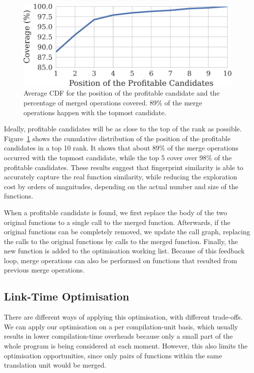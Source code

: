 \begin{figure}[t!]
  \centering
  \includegraphics[width=0.8\linewidth]{src/merging-optimisation/figs/average-cdf-exploration-threshold.pdf}
  \caption{Average CDF for the position of the profitable candidate and the percentage of merged operations covered.
           89\% of the merge operations happen with the topmost candidate.}
  \label{fig:average-cdf-exploration-threshold}
\end{figure}

Ideally, profitable candidates will be as close to the top of the rank as
possible.
Figure~\ref{fig:average-cdf-exploration-threshold} shows the cumulative
distribution of the position of the profitable candidates in a top 10 rank.
It shows that about 89\% of the merge operations occurred with the topmost
candidate, while the top 5 cover over 98\% of the profitable candidates.
These results suggest that fingerprint similarity is able to
accurately capture the real function similarity, while reducing the exploration
cost by orders of magnitudes, depending on the actual number and size of
the functions.

When a profitable candidate is found, we first replace the body of the two
original functions to a single call to the merged function.
Afterwards, if the original functions can be completely removed, we update the
call graph, replacing the calls to the original functions by calls to the
merged function.
Finally, the new function is added to the optimisation working list.
Because of this feedback loop, merge operations can also be performed on
functions that resulted from previous merge operations.

\subsection{Link-Time Optimisation}

There are different ways of applying this optimisation, with different trade-offs.
We can apply our optimisation on a per compilation-unit basis, which usually
results in lower compilation-time overheads because only a small part of the
whole program is being considered at each moment.
However, this also limits the optimisation opportunities, since only pairs of
functions within the same translation unit would be merged.

